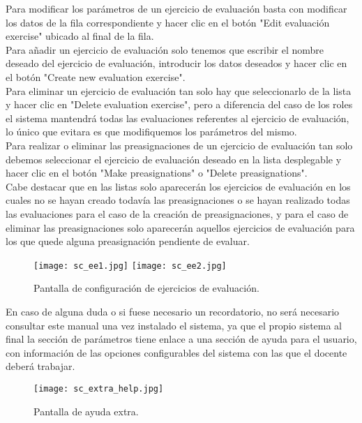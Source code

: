 Para modificar los parámetros de un ejercicio de evaluación basta con modificar los datos de la fila correspondiente y hacer clic en el botón "Edit evaluación exercise" ubicado al final de la fila. \\

Para añadir un ejercicio de evaluación solo tenemos que escribir el nombre deseado del ejercicio de evaluación, introducir los datos deseados y hacer clic en el botón "Create new evaluation exercise".\\

Para eliminar un ejercicio de evaluación tan solo hay que seleccionarlo de la lista y hacer clic en "Delete evaluation exercise", pero a diferencia del caso de los roles el sistema mantendrá todas las evaluaciones referentes al ejercicio de evaluación, lo único que evitara es que modifiquemos los parámetros del mismo.\\

Para realizar o eliminar las preasignaciones de un ejercicio de evaluación tan solo debemos seleccionar el ejercicio de evaluación deseado en la lista desplegable y hacer clic en el botón "Make preasignations" o "Delete preasignations".\\ 

Cabe destacar que en las listas solo aparecerán los ejercicios de evaluación en los cuales no se hayan creado todavía las preasignaciones o se hayan realizado todas las evaluaciones para el caso de la creación de preasignaciones, y para el caso de eliminar las preasignaciones solo aparecerán aquellos ejercicios de evaluación para los que quede alguna preasignación pendiente de evaluar.\\

\begin{figure}[h!]
	\centering
	\texttt{[image: sc\_ee1.jpg]}
	\texttt{[image: sc\_ee2.jpg]}
	\caption{Pantalla de configuración de ejercicios de evaluación.}
\end{figure}
\clearpage

En caso de alguna duda o si fuese necesario un recordatorio, no será necesario consultar este manual una vez instalado el sistema, ya que el propio sistema al final la sección de parámetros tiene enlace a una sección de ayuda para el usuario, con información de las opciones configurables del sistema con las que el docente deberá trabajar.

\begin{figure}[h!]
	\centering
	\texttt{[image: sc\_extra\_help.jpg]}
	\caption{Pantalla de ayuda extra.}
\end{figure}
\clearpage





